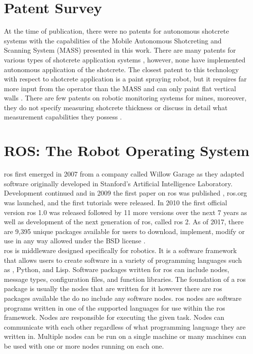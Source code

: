 \section{Patent Survey}

At the time of publication, there were no patents for autonomous shotcrete systems with the capabilities of the Mobile Autonomous Shotcreting and Scanning System (MASS) presented in this work. There are many patents for various types of shotcrete application systems \cite{cn1,cn2,cn3,cn4,cn5,cn6,cn7,cn8}, however, none have implemented autonomous application of the shotcrete. The closest patent to this technology with respect to shotcrete application is a paint spraying robot, but it requires far more input from the operator than the MASS and can only paint flat vertical walls \cite{paintpat}. There are few patents on robotic monitoring systems for mines, moreover, they do not specify measuring shotcrete thickness or discuss in detail what measurement capabilities they possess \cite{pat1,pat2}.\\

\section{ROS: The Robot Operating System}
\label{sec:ros}

\acrshort{ros} first emerged in 2007 from a company called Willow Garage as they adapted software originally developed in Stanford's Artificial Intelligence Laboratory. Development continued and in 2009 the first paper on \acrshort{ros} was published \cite{rosfirst}, \acrshort{ros}.org was launched, and the first tutorials were released. In 2010 the first official version \acrshort{ros} 1.0 was released followed by 11 more versions over the next 7 years as well as development of the next generation of \acrshort{ros}, called \acrshort{ros} 2. As of 2017, there are 9,395 unique packages available for users to download, implement, modify or use in any way allowed under the BSD license \cite{bsd}.\\

\acrshort{ros} is middleware designed specifically for robotics. It is a software framework that allows users to create software in a variety of programming languages such as \CC, Python, and Lisp. Software packages written for \acrshort{ros} can include nodes, message types, configuration files, and function libraries. The foundation of a \acrshort{ros} package is usually the nodes that are written for it however there are \acrshort{ros} packages available the do no include any software nodes. \acrshort{ros} nodes are software programs written in one of the supported languages for use within the \acrshort{ros} framework. Nodes are responsible for executing the given task. Nodes can communicate with each other regardless of what programming language they are written in. Multiple nodes can be run on a single machine or many machines can be used with one or more nodes running on each one.\\

